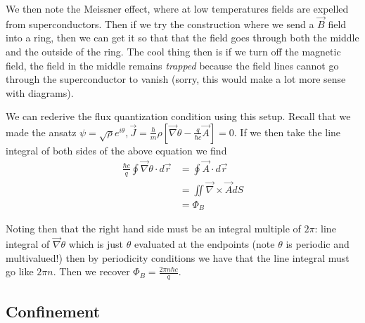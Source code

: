 \documentclass[12pt]{article}
\begin{document}
We then note the Meissner effect, where at low temperatures fields are expelled from superconductors. Then if we try the construction where we send a $\vec{B}$ field into a ring, then we can get it so that that the field goes through both the middle and the outside of the ring. The cool thing then is if we turn off the magnetic field, the field in the middle remains \emph{trapped} because the field lines cannot go through the superconductor to vanish (sorry, this would make a lot more sense with diagrams). 

We can rederive the flux quantization condition using this setup. Recall that we made the ansatz $\psi = \sqrt{\rho}e^{i\theta}, \vec{J} = \frac{\hbar}{m}\rho\left[ \vec{\nabla}\theta - \frac{q}{\hbar c}\vec{A} \right] = 0$. If we then take the line integral of both sides of the above equation we find
\begin{align}
    \frac{\hbar c}{q}\oint \vec{\nabla} \theta \cdot d\vec{r} &= \oint \vec{A} \cdot d\vec{r}\\
    &= \iint \vec{\nabla} \times \vec{A} dS\\
    &= \Phi_B
\end{align}

Noting then that the right hand side must be an integral multiple of $2\pi$: line integral of $\vec{\nabla}\theta$ which is just $\theta$ evaluated at the endpoints (note $\theta$ is periodic and multivalued!) then by periodicity conditions we have that the line integral must go like $2\pi n$. Then we recover $\Phi_B = \frac{2\pi n\hbar c}{q}$. 

\subsection{Confinement}
\end{document}
